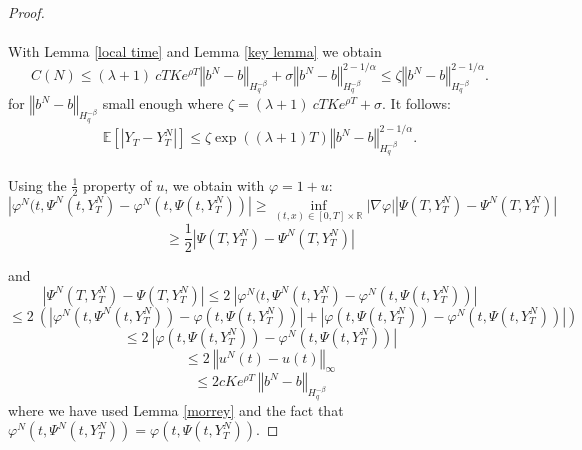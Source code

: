 \documentclass[12pt]{article}
\newcommand{\norme}[1]{\left\Vert #1\right\Vert}
\newcommand{\R}{\mathbb{R}}
\newcommand{\E}{\mathbb{E}}
\begin{document}
\begin{proof}
    
    \paragraph{}
    With Lemma \ref{local time} and Lemma \ref{key lemma} we obtain \begin{equation*}
    C(N) \leq (\lambda + 1)\ cTKe^{\rho T}\norme{b^N-b}_{H^{-\beta}_{q}} + \sigma\norme{b^N-b}_{H^{-\beta}_{q}}^{2-1/\alpha} \leq \zeta \norme{b^N-b}_{H^{-\beta}_{q}}^{2-1/\alpha}.
    \end{equation*}   
    for $\norme{b^N-b}_{H^{-\beta}_{q}}$ small enough where $\zeta = (\lambda + 1)\ cTKe^{\rho T} + \sigma $. It follows:
    \begin{equation}\label{gronfinal}
    \E\left[\left|Y_T-Y_T^N\right|\right] \leq \zeta \exp((\lambda+1)T) \norme{b^N-b}_{H^{-\beta}_{q}}^{2-1/\alpha}.
    \end{equation}
    
    \paragraph{}
    Using the $\frac{1}{2}$ property of $u$, we obtain with $\varphi=1+u$:
    \begin{equation*}
    |\varphi^N(t,\Psi^N(t,Y_T^N)-\varphi^N(t,\Psi(t,Y_T^N))| \geq \underset{(t,x)\in[0,T]\times\R}{\inf}|\nabla\varphi|
    \left|\Psi\left(T,Y_T^N\right)-\Psi^N\left(T,Y_T^N\right)\right|
    \end{equation*}
    \begin{equation*}
    \geq \frac{1}{2} \left|\Psi\left(T,Y_T^N\right)-\Psi^N\left(T,Y_T^N\right)\right|
    \end{equation*}
    
    and 
    \begin{equation*}
    \left|\Psi^N\left(T,Y_T^N\right)-\Psi\left(T,Y_T^N\right)\right|\leq 2\ |\varphi^N(t,\Psi^N(t,Y_T^N)-\varphi^N(t,\Psi(t,Y_T^N))|
    \end{equation*}   
    \begin{equation*}
    \leq 2\ \left(|\varphi^N(t,\Psi^N(t,Y_T^N))-\varphi(t,\Psi(t,Y_T^N))|+|\varphi(t,\Psi(t,Y_T^N))-\varphi^N(t,\Psi(t,Y_T^N))|\right)
    \end{equation*} 
    \begin{equation*}
    \leq 2\ |\varphi(t,\Psi(t,Y_T^N))-\varphi^N(t,\Psi(t,Y_T^N))|
    \end{equation*}   
    \begin{equation*}
    \leq 2\ \norme{u^N(t)-u(t)}_\infty
    \end{equation*} 
    \begin{equation}\label{other}
    \leq 2cKe^{\rho T}\ \norme{b^N-b}_{H^{-\beta}_q}
    \end{equation} 
    where we have used Lemma \ref{morrey} and the fact that $\varphi^N(t,\Psi^N(t,Y_T^N))=\varphi(t,\Psi(t,Y_T^N))$. 
    

\end{proof}
\end{document}
